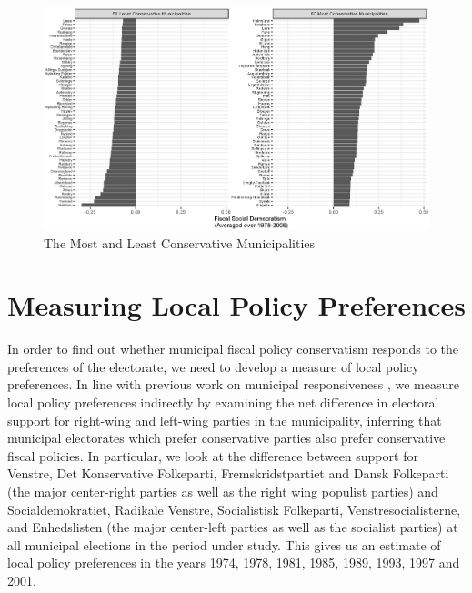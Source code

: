 \documentclass[a4paper,12pt]{article}
\begin{document}
\begin{figure}
	\centering
	\includegraphics[width=1\textwidth]{socialdemocratism.eps}
	\caption{The Most and Least Conservative Municipalities} \label{mostleast}
\end{figure}


\section{Measuring Local Policy Preferences}

In order to find out whether municipal fiscal policy conservatism responds to the preferences of the electorate, we need to develop a measure of local policy preferences. In line with previous work on municipal responsiveness \cite[e.g.,][]{sances2017ideology,einstein2016pushing}, we measure local policy preferences indirectly by examining the net difference in electoral support for right-wing and left-wing parties in the municipality, inferring that municipal electorates which prefer conservative parties also prefer conservative fiscal policies. In particular, we look at the difference between support for Venstre, Det Konservative Folkeparti, Fremskridstpartiet and Dansk Folkeparti (the major center-right parties as well as the right wing populist parties) and Socialdemokratiet, Radikale Venstre, Socialistisk Folkeparti, Venstresocialisterne, and Enhedslisten (the major center-left parties as well as the socialist parties) at all municipal elections in the period under study. This gives us an estimate of local policy preferences in the years 1974, 1978, 1981, 1985, 1989, 1993, 1997 and 2001. 
\end{document}
